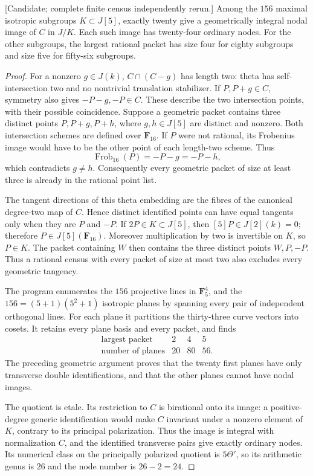 \begin{lemma}
\label{lem:five-theta-geometric-census-candidate}
\textup{[Candidate; complete finite census independently rerun.]}
Among the $156$ maximal isotropic subgroups $K\subset J[5]$, exactly
twenty give a geometrically integral nodal image of $C$ in $J/K$.
Each such image has twenty-four ordinary nodes. For the other
subgroups, the largest rational packet has size four for eighty
subgroups and size five for fifty-six subgroups.
\end{lemma}
\begin{proof}
For a nonzero $g\in J(k)$, $C\cap(C-g)$ has length two: theta has
self-intersection two and no nontrivial translation stabilizer.
If $P,P+g\in C$, symmetry also gives $-P-g,-P\in C$.
These describe the two intersection points, with their possible
coincidence. Suppose a geometric packet contains three distinct
points $P,P+g,P+h$, where $g,h\in J[5]$ are distinct and nonzero.
Both intersection schemes are defined over $\mathbf F_{16}$.
If $P$ were not rational, its Frobenius image would have to be
the other point of each length-two scheme. Thus
\[
             \operatorname{Frob}_{16}(P)=-P-g=-P-h,
\]
which contradicts $g\ne h$. Consequently every geometric packet
of size at least three is already in the rational point list.

The tangent directions of this theta embedding are the fibres of
the canonical degree-two map of $C$. Hence distinct identified
points can have equal tangents only when they are $P$ and $-P$.
If $2P\in K\subset J[5]$, then $[5]P\in J[2](k)=0$; therefore
$P\in J[5](\mathbf F_{16})$. Moreover multiplication by two is
invertible on $K$, so $P\in K$. The packet containing $W$ then
contains the three distinct points $W,P,-P$. Thus a rational
census with every packet of size at most two also excludes every
geometric tangency.

The program enumerates the $156$ projective lines in
$\mathbf F_5^4$, and the $156=(5+1)(5^2+1)$ isotropic planes by
spanning every pair of independent orthogonal lines. For each
plane it partitions the thirty-three curve vectors into cosets.
It retains every plane basis and every packet, and finds
\[
 \begin{array}{c|ccc}
 \text{largest packet}&2&4&5\\ \hline
 \text{number of planes}&20&80&56.
 \end{array}
\]
The preceding geometric argument proves that the twenty first
planes have only transverse double identifications, and that the
other planes cannot have nodal images.

The quotient is etale. Its restriction to $C$ is birational onto
its image: a positive-degree generic identification would make
$C$ invariant under a nonzero element of $K$, contrary to its
principal polarization. Thus the image is integral with
normalization $C$, and the identified transverse pairs give exactly
ordinary nodes. Its numerical class on the principally polarized
quotient is $5\Theta'$, so its arithmetic genus is $26$ and the
node number is $26-2=24$.
\end{proof}

